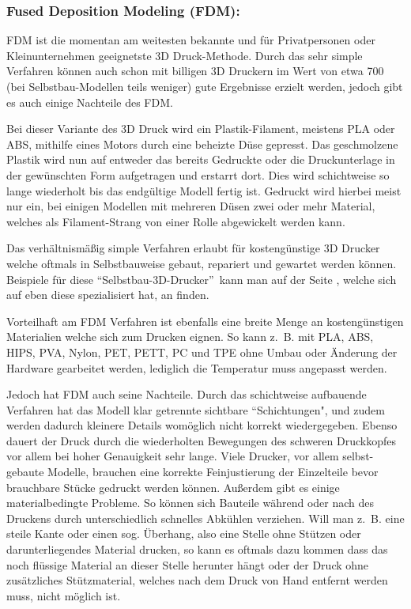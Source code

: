 \subsubsection{Fused Deposition Modeling (FDM):}

FDM ist die momentan am weitesten bekannte und für Privatpersonen oder Kleinunternehmen geeignetste 3D Druck-Methode. Durch das sehr simple Verfahren können auch schon mit billigen 3D Druckern im Wert von etwa 700\EURO ~ (bei Selbstbau-Modellen teils weniger) gute Ergebnisse erzielt werden, jedoch gibt es auch einige Nachteile des FDM.

Bei dieser Variante des 3D Druck wird ein Plastik-Filament, meistens PLA oder ABS, mithilfe eines Motors durch eine beheizte Düse gepresst. Das geschmolzene Plastik wird nun auf entweder das bereits Gedruckte oder die Druckunterlage in der gewünschten Form aufgetragen und erstarrt dort.
Dies wird schichtweise so lange wiederholt bis das endgültige Modell fertig ist. Gedruckt wird hierbei meist nur ein, bei einigen Modellen mit mehreren Düsen zwei oder mehr Material, welches als Filament-Strang von einer Rolle abgewickelt werden kann.

Das verhältnismäßig simple Verfahren erlaubt für kostengünstige 3D Drucker welche oftmals in Selbstbauweise gebaut, repariert und gewartet werden können. Beispiele für diese \textquotedblleft Selbstbau-3D-Drucker\textquotedblright~kann man auf der Seite , welche sich auf eben diese spezialisiert hat, an finden.

Vorteilhaft am FDM Verfahren ist ebenfalls eine breite Menge an kostengünstigen Materialien welche sich zum Drucken eignen. So kann z.~B. mit PLA, ABS, HIPS, PVA, Nylon, PET, PETT, PC und TPE \parencite{MATERIALS} ohne Umbau oder Änderung der Hardware gearbeitet werden, lediglich die Temperatur muss angepasst werden.

Jedoch hat FDM auch seine Nachteile.
Durch das schichtweise aufbauende Verfahren hat das Modell klar getrennte sichtbare \textquotedblleft Schichtungen", und zudem werden dadurch kleinere Details womöglich nicht korrekt wiedergegeben. Ebenso dauert der Druck durch die wiederholten Bewegungen des schweren Druckkopfes vor allem bei hoher Genauigkeit sehr lange. Viele Drucker, vor allem selbst-gebaute Modelle, brauchen eine korrekte Feinjustierung der Einzelteile bevor brauchbare Stücke gedruckt werden können. Außerdem gibt es einige materialbedingte Probleme. So können sich Bauteile während oder nach des Druckens durch unterschiedlich schnelles Abkühlen verziehen. Will man z.~B. eine steile Kante oder einen sog. Überhang, also eine Stelle ohne Stützen oder darunterliegendes Material drucken, so kann es oftmals dazu kommen dass das noch flüssige Material an dieser Stelle herunter hängt oder der Druck ohne zusätzliches Stützmaterial, welches nach dem Druck von Hand entfernt werden muss, nicht möglich ist. \parencite[Informationen aus:][]{FDMDetail,DRUCKVERFAHREN}